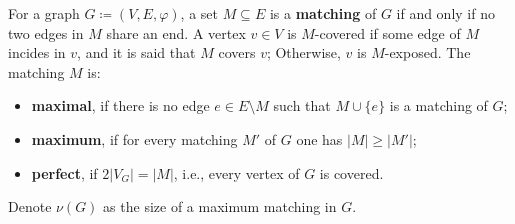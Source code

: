 \begin{definition}[Matching]
	\label{def:matching}
	For a graph \(G \coloneqq (V, E, \varphi)\), a set \(M \subseteq E\) is a \textbf{matching} of \(G\) if and only if no two edges in \(M\) share an end.
	A vertex \(v \in V\) is \(M\)-covered if some edge of \(M\) incides in \(v\), 
	and it is said that \(M\) covers \(v\);
	Otherwise, \(v\) is \(M\)-exposed.
	The matching \(M\) is:
	\begin{itemize}
		\item 
			\textbf{maximal}, if there is no edge \(e \in E \setminus M\) such that \(M \cup \{e\}\) is a matching of \(G\);

		\item
			\textbf{maximum}, if for every matching \(M'\) of \(G\) one has \(|M| \geq |M'|\);
	
		\item
			\textbf{perfect}, if \(2|V_G| = |M|\), i.e., every vertex of \(G\) is covered.
	\end{itemize}
	Denote \(\nu(G)\) as the size of a maximum matching in \(G\).
\end{definition}

